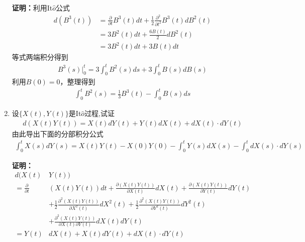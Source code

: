 \begin{enumerate}
	      \textbf{证明：}利用It\(\hat{o}\)公式
	      \begin{align*}
		      d(B^3(t))
		       & =\frac{\partial}{\partial t}B^3(t)dt+\frac{1}{2}\frac{\partial^2}{\partial t^2}B^3(t)dB^2(t) \\
		       & =3B^2(t)dt+\frac{6B(t)}{2}dB^2(t)                                                            \\
		       & =3B^2(t)dt+3B(t)dt
	      \end{align*}
	      等式两端积分得到
	      \begin{align*}
		      B^3(s)\bigg|_0^t=3\int_{0}^{t}B^2(s)ds+3\int_{0}^{t}B(s)dB(s)
	      \end{align*}
	      利用\(B(0)=0\)，整理得到
	      \begin{align*}
		      \int_{0}^{t}B^2(s)=\frac{1}{3}B^3(t)-\int_{0}^{t}B(s)ds
	      \end{align*}
	\item 设\(\{X(t),Y(t)\}\)是It\(\hat{o}\)过程,试证
	      \begin{align*}
		      d(X(t)Y(t))=X(t)dY(t)+Y(t)dX(t)+dX(t)\cdot dY(t)
	      \end{align*}
	      由此导出下面的分部积分公式
	      \begin{align*}
		      \int_{0}^{t}X(s)dY(s)=X(t)Y(t)-X(0)Y(0)-\int_{0}^{t}Y(s)dX(s)-\int_{0}^{t}dX(s)\cdot dY(s)
	      \end{align*}

	      \textbf{证明：}
	      \begin{align*}
		      d(X(t)                       & Y(t))                                                              \\
		      =\frac{\partial}{\partial t} & (X(t)Y(t))dt+\frac{\partial(X(t)Y(t))}{\partial X(t)}dX(t)
		      +\frac{\partial(X(t)Y(t))}{\partial Y(t)}dY(t)                                                    \\
		                                   & +\frac{1}{2}\frac{\partial^2(X(t)Y(t))}{\partial X^2(t)}dX^2(t)
		      +\frac{1}{2}\frac{\partial^2(X(t)Y(t))}{\partial Y^2(t)}dY^2(t)                                   \\
		                                   & +\frac{\partial^2(X(t)Y(t))}{\partial X(t)\partial Y(t)}dX(t)dY(t) \\
		      =Y(t)                        & dX(t)+X(t)dY(t)+dX(t)\cdot dY(t)
	      \end{align*}
\end{enumerate}